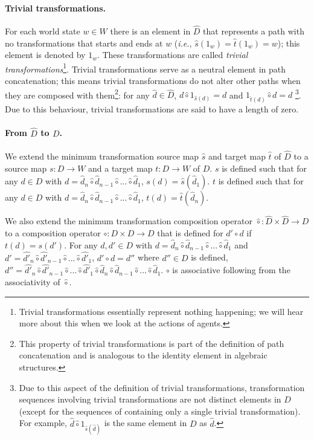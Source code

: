 \paragraph{Trivial transformations.}
For each world state $w \in W$ there is an element in $\hat{D}$ that represents a path with no transformations that starts and ends at $w$ (\textit{i.e.}, $\hat{s}(1_{w}) = \hat{t}(1_{w}) = w$); this element is denoted by $1_{w}$.
These transformations are called \emph{trivial transformations}\footnote{Trivial transformations essentially represent nothing happening; we will hear more about this when we look at the actions of agents.}.
Trivial transformations serve as a neutral element in path concatenation; this means trivial transformations do not alter other paths when they are composed with them\footnote{This property of trivial transformations is part of the definition of path concatenation and is analogous to the identity element in algebraic structures.}: for any $\hat{d} \in \hat{D}$, $d \hat{\circ} 1_{\hat{s}(d)} = d$ and $1_{\hat{t}(d)} \hat{\circ} d = d$ \footnote{Due to this aspect of the definition of trivial transformations, transformation sequences involving trivial transformations are not distinct elements in $D$ (except for the sequences of containing only a single trivial transformation).
For example, $\hat{d} \hat{\circ} 1_{\hat{s}(\hat{d})}$ is the same element in $D$ as $\hat{d}$.}.
Due to this behaviour, trivial transformations are said to have a length of zero.

\paragraph{From $\hat{D}$ to $D$.}
We extend the minimum transformation source map $\hat{s}$ and target map $\hat{t}$ of $\hat{D}$ to a source map $s: D \to W$ and a target map $t: D \to W$ of $D$.
$s$ is defined such that for any $d \in D$ with $d = \hat{d}_{n} \hat{\circ} \hat{d}_{n-1} \hat{\circ} ... \hat{\circ} \hat{d}_{1}$, $s(d) = \hat{s}(\hat{d}_{1})$.
$t$ is defined such that for any $d \in D$ with $d = \hat{d}_{n} \hat{\circ} \hat{d}_{n-1} \hat{\circ} ... \hat{\circ} \hat{d}_{1}$, $t(d) = \hat{t}(\hat{d}_{n})$.

We also extend the minimum transformation composition operator $\hat{\circ}: \hat{D} \times \hat{D} \to D$ to a composition operator $\circ: D \times D \to D$ that is defined for $d' \circ d$ if $t(d) = s(d')$.
For any $d, d' \in D$ with $d = \hat{d}_{n} \hat{\circ} \hat{d}_{n-1} \hat{\circ} ... \hat{\circ} \hat{d}_{1}$ and $d' = \hat{d'}_{n} \hat{\circ} \hat{d'}_{n-1} \hat{\circ} ... \hat{\circ} \hat{d'}_{1}$, $d' \circ d = d''$ where $d'' \in D$ is defined, $d'' = \hat{d'}_{n} \hat{\circ} \hat{d'}_{n-1} \hat{\circ} ... \hat{\circ} \hat{d'}_{1} \hat{\circ} \hat{d}_{n} \hat{\circ} \hat{d}_{n-1} \hat{\circ} ... \hat{\circ} \hat{d}_{1}$.
$\circ$ is associative following from the associativity of $\hat{\circ}$.

